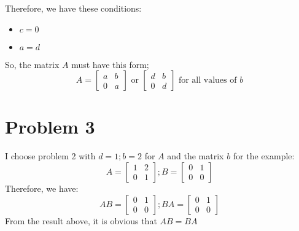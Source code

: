 \documentclass[10pt]{article}
\begin{document}
\noindent Therefore, we have these conditions:
\begin{itemize}
    \item $c=0$
    \item $a=d$
\end{itemize}
\noindent So, the matrix $A$ must have this form;
\begin{equation*}
    A = 
    \begin{bmatrix}
        a & b \\
        0 & a
    \end{bmatrix}
    \text{ or }
    \begin{bmatrix}
        d & b \\
        0 & d
    \end{bmatrix}
    \text{  for all values of $b$}
\end{equation*}


\section*{Problem 3}
\noindent I choose problem 2 with $d=1; b=2$ for $A$ and the matrix $b$ for the example:
\begin{equation*}
    A = 
    \begin{bmatrix}
        1 & 2 \\
        0 & 1
    \end{bmatrix};
    B =
    \begin{bmatrix}
        0 & 1 \\
        0 & 0
    \end{bmatrix}
\end{equation*}
\noindent Therefore, we have:
\begin{equation*}
    AB=
    \begin{bmatrix}
        0 & 1 \\
        0 & 0
    \end{bmatrix};
    BA = 
    \begin{bmatrix}
        0 & 1 \\
        0 & 0
    \end{bmatrix}
\end{equation*}
\noindent From the result above, it is obvious that $AB=BA$
\end{document}
